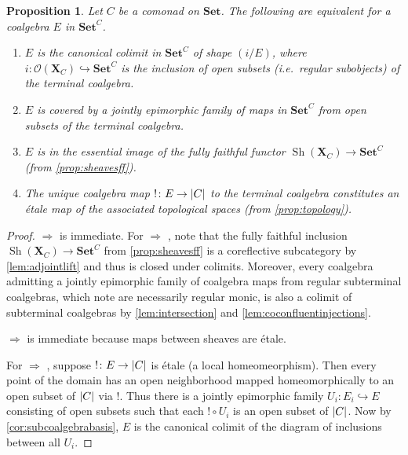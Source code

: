 \documentclass[11pt, oneside, article]{memoir}
\theoremstyle{plain}
\newtheorem{proposition}[theorem]{Proposition}
\theoremstyle{definition}
\theoremstyle{remark}
\DeclareMathOperator{\Sh}{Sh}
\DeclarePairedDelimiter{\abs}{\lvert}{\rvert}
\newcommand{\imp}{\Rightarrow}
\newcommand{\bang}{\mathrm{!}}
\newcommand{\namedcat}[1]{\mathbf{#1}}
\newcommand{\spa}[1]{\mathbf{#1}}
\newcommand{\Set}{\namedcat{Set}}
\newcommand{\CoalgOn}[2]{{#2}^{#1}}
\newcommand{\CoalgSet}[1]{\CoalgOn{#1}{\Set}}
\newcommand{\pts}[1]{{\abs{#1}}}
\newcommand{\cmnd}[1]{{#1}}
\newcommand{\eE}{E}
\newcommand{\xU}{U}
\newcommand{\cC}{\cmnd{C}}
\newcommand{\tX}{\spa{X}}
\newcommand{\CSet}{\CoalgSet{\cC}}
\newcommand{\cmdtotop}[1]{{\tX_{#1}}}
\newcommand{\opens}[1]{\mathcal{O}(#1)}
\begin{document}
\begin{proposition}\label{lem:bangetale}
  Let $\cC$ be a comonad on $\Set$. The following are equivalent for a
  coalgebra $\eE$ in $\CSet$.
  \begin{enumerate}[label=(\roman*)]
  \item $\eE$ is the canonical colimit in $\CSet$ of shape
    $(i / \eE)$, where
    $i \colon \opens{\cmdtotop{\cC}} \hookrightarrow \CSet$ is the
    inclusion of open subsets (i.e.\ regular subobjects) of the terminal
    coalgebra.\label{item:cancolimit}
  \item $\eE$ is covered by a jointly epimorphic family of maps in
    $\CSet$ from open subsets of the terminal
    coalgebra.\label{item:iscolimit}
  \item $\eE$ is in the essential image of the fully faithful functor
    $\Sh(\cmdtotop{\cC}) \to \CSet$ (from
    \cref{prop:sheavesff}).\label{item:issheaf}
  \item The unique coalgebra map $\bang\colon \eE\to\pts{\cC}$ to
    the terminal coalgebra constitutes an \'etale map of the
    associated topological spaces (from
    \cref{prop:topology}).\label{item:isetale}
  \end{enumerate}
\end{proposition}
\begin{proof}
   $\imp$  is
  immediate. For  $\imp$
  , note that the fully faithful inclusion
  $\Sh(\cmdtotop{\cC}) \to \CSet$ from \cref{prop:sheavesff} is a
  coreflective subcategory by \cref{lem:adjointlift} and thus is
  closed under colimits. Moreover, every coalgebra admitting a jointly
  epimorphic family of coalgebra maps from regular subterminal
  coalgebras, which note are necessarily regular monic, is also a
  colimit of subterminal coalgebras by \cref{lem:intersection} and
  \cref{lem:coconfluentinjections}.
  
   $\imp$  is
  immediate because maps between sheaves are \'etale.

  For  $\imp$ ,
  suppose $\bang \colon \eE \to \pts{\cC}$ is \'etale (a local
  homeomeorphism). Then every point of the domain has an open
  neighborhood mapped homeomorphically to an open subset of
  $\pts{\cC}$ via $\bang$. Thus there is a jointly epimorphic family
  $\xU_i \colon \eE_i \hookrightarrow \eE$ consisting of open
  subsets such that each $\bang \circ U_i$ is an open subset of
  $\pts{\cC}$. Now by \cref{cor:subcoalgebrabasis}, $\eE$ is the
  canonical colimit of the diagram of inclusions between all $\xU_i$.
\end{proof}
\end{document}
